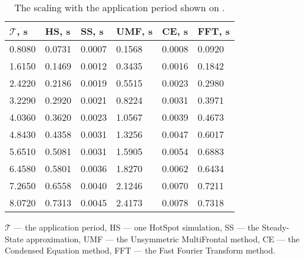 \begin{table}
  \caption{The scaling with the application period shown on .}
  \label{tab:scaling-time}
  \begin{center}
  \begin{tabular}{ |l|l|l|l|l|l| }
  \hline
  $\mathcal{T}$, s & HS, s & SS, s & UMF, s & CE, s & FFT, s \\
  \hline
  \hline
  0.8080 & 0.0731 & 0.0007 & 0.1568 & 0.0008 & 0.0920 \\
  1.6150 & 0.1469 & 0.0012 & 0.3435 & 0.0016 & 0.1842 \\
  2.4220 & 0.2186 & 0.0019 & 0.5515 & 0.0023 & 0.2980 \\
  3.2290 & 0.2920 & 0.0021 & 0.8224 & 0.0031 & 0.3971 \\
  4.0360 & 0.3620 & 0.0023 & 1.0567 & 0.0039 & 0.4673 \\
  4.8430 & 0.4358 & 0.0031 & 1.3256 & 0.0047 & 0.6017 \\
  5.6510 & 0.5081 & 0.0031 & 1.5905 & 0.0054 & 0.6883 \\
  6.4580 & 0.5801 & 0.0036 & 1.8270 & 0.0062 & 0.6434 \\
  7.2650 & 0.6558 & 0.0040 & 2.1246 & 0.0070 & 0.7211 \\
  8.0720 & 0.7313 & 0.0045 & 2.4173 & 0.0078 & 0.7318 \\
  \hline
  \end{tabular}
  \end{center}
  $\mathcal{T}$ --- the application period, HS --- one HotSpot simulation, SS --- the Steady-State approximation, UMF --- the Unsymmetric MultiFrontal method, CE --- the Condensed Equation method, FFT --- the Fast Fourier Transform method.
\end{table}

